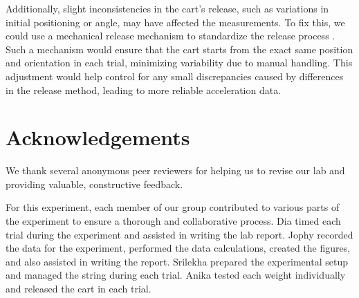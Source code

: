 ﻿\documentclass[reprint,amsmath,amssymb.aps]{revtex4-2}
\begin{document}
Additionally, slight inconsistencies in the cart’s release, such as variations in initial positioning or angle, may have affected the measurements. To fix this, we could use a mechanical release mechanism to standardize the release process \cite{taylor1997introduction}. Such a mechanism would ensure that the cart starts from the exact same position and orientation in each trial, minimizing variability due to manual handling. This adjustment would help control for any small discrepancies caused by differences in the release method, leading to more reliable acceleration data.





\section{Acknowledgements}
We thank several anonymous peer reviewers for helping us to revise our lab and providing valuable, constructive feedback. 

For this experiment, each member of our group contributed to various parts of the experiment to ensure a thorough and collaborative process. Dia timed each trial during the experiment and assisted in writing the lab report. Jophy recorded the data for the experiment, performed the data calculations, created the figures, and also assisted in writing the report. Srilekha prepared the experimental setup and managed the string during each trial. Anika tested each weight individually and released the cart in each trial. 




\end{document}
